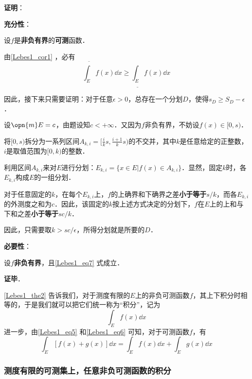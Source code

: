 \textbf{证明}：

\textbf{充分性}：

设$f$是\textbf{非负有界}的\textbf{可测}函数．

由\autoref{Lebes1_cor1} ，必有
\begin{equation}
\overline{\int_E} f(x) \dd x \geq \underline{\int_E} f(x) \dd x
\end{equation}

因此，接下来只需要证明：对于任意$\epsilon>0$，总存在一个分划$D$，使得$s_D\geq S_D-\epsilon$．

设$\opn{m}E=c$，由题设知$c<+\infty$．又因为$f$非负有界，不妨设$f(x)\in [0, s)$．

将$[0, s)$拆分为一系列区间$A_{k, i}=[\frac{i}{k}s, \frac{i+1}{k}s)$的不交并，其中$k$是任意给定的正整数，$i$是取值范围为$[0, k)$的整数．

利用区间$A_{k, i}$来对$E$进行分划：$E_{k, i}=\{x\in E|f(x)\in A_{k, i}\}$．显然，固定$k$时，各$E_{k, i}$构成$E$的一组分划．

对于任意固定的$k$，在每个$E_{k, i}$上，$f$的上确界和下确界之差\textbf{小于等于}$s/k$，而各$E_{k, i}$的外测度之和为$c$．因此，该固定的$k$按上述方式决定的分划下，$f$在$E$上的上和与下和之差\textbf{小于等于}$sc/k$．

因此，只需要取$k>sc/\epsilon$，所得分划就是所要的$D$．

\textbf{必要性}：

设$f$\textbf{非负有界}，且\autoref{Lebes1_eq7} 式成立．




\textbf{证毕}．



\autoref{Lebes1_the2} 告诉我们，对于测度有限的$E$上的非负可测函数$f$，其上下积分时相等的，于是我们就可以把它们统一称为“积分”，记为
\begin{equation}
\int_E f(x) \dd x
\end{equation}
进一步，由\autoref{Lebes1_eq5} 和\autoref{Lebes1_eq6} 可知，对于可测函数$f$，有
\begin{equation}
\int_E [f(x)+g(x)] \dd x=\int_E f(x) \dd x+\int_E g(x) \dd x
\end{equation}






\subsubsection{测度有限的可测集上，任意非负可测函数的积分}

